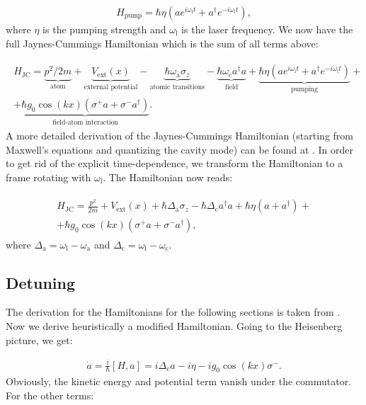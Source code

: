 \begin{align}
H_\text{pump} = \hbar \eta (a e^{i\omega_\text{l}t} + a^\dagger e^{-i\omega_\text{l}t}),
\end{align}where $\eta$ is the pumping strength and $\omega_\text{l}$ is the laser frequency. We now have the full Jaynes-Cummings Hamiltonian which is the sum of all terms above:

\begin{align}
\begin{split}
H_\text{JC} = \underbrace{p^2 / 2m}_\text{atom} + \underbrace{V_\text{ext}(x)}_\text{external potential} - \underbrace{\hbar \omega_\text{a} \sigma_z}_\text{atomic transitions} - \underbrace{\hbar \omega_\text{c} a^\dagger a}_\text{field} + \underbrace{\hbar \eta (a e^{i \omega_\text{l} t} + a^\dagger e^{-i \omega_\text{l} t})}_\text{pumping} + \\
+ \underbrace{\hbar g_0 \cos(kx) (\sigma^+ a + \sigma^- a^\dagger)}_\text{field-atom interaction}.
\end{split}
\end{align}A more detailed derivation of the Jaynes-Cummings Hamiltonian (starting from Maxwell's equations and quantizing the cavity mode) can be found at \cite{collapseandrevival}. In order to get rid of the explicit time-dependence, we transform the Hamiltonian to a frame rotating with $\omega_\text{l}$. The Hamiltonian now reads:

\begin{align}
\begin{split}
H_\text{JC} = \frac{p^2}{2m} + V_\text{ext}(x) + \hbar \Delta_\text{a} \sigma_z - \hbar \Delta_\text{c} a^\dagger a + \hbar \eta (a + a^\dagger) + \\
+ \hbar g_0 \cos(kx) (\sigma^+ a + \sigma^- a^\dagger),
\end{split}
\end{align}where $\Delta_\text{a} = \omega_\text{l} - \omega_\text{a}$ and $\Delta_\text{c} = \omega_\text{l} - \omega_\text{c}$.

\subsection{Detuning}
The derivation for the Hamiltonians for the following sections is taken from \cite{donner}. Now we derive heuristically a modified Hamiltonian. Going to the Heisenberg picture, we get:

\begin{align}
\dot{a} = \frac{i}{\hbar} [H, a] = i \Delta_\text{c} a - i \eta -i g_0 \cos(kx) \sigma^-.
\label{a_dot}
\end{align}Obviously, the kinetic energy and potential term vanish under the commutator. For the other terms:

